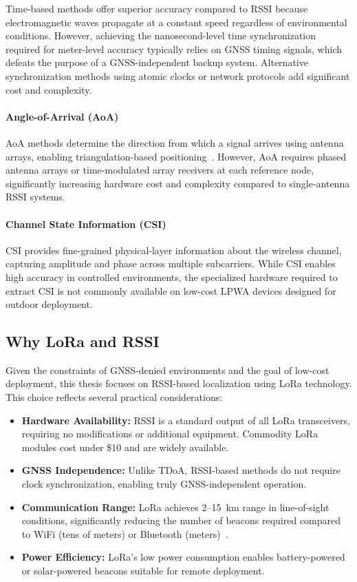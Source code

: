 \documentclass[master,final,11pt]{iscs-thesis}
\begin{document}
Time-based methods offer superior accuracy compared to RSSI because electromagnetic waves propagate at a constant speed regardless of environmental conditions.
However, achieving the nanosecond-level time synchronization required for meter-level accuracy typically relies on GNSS timing signals, which defeats the purpose of a GNSS-independent backup system.
Alternative synchronization methods using atomic clocks or network protocols add significant cost and complexity.

\paragraph{Angle-of-Arrival (AoA)}
AoA methods determine the direction from which a signal arrives using antenna arrays, enabling triangulation-based positioning~\cite{zafari2019survey}.
However, AoA requires phased antenna arrays or time-modulated array receivers at each reference node, significantly increasing hardware cost and complexity compared to single-antenna RSSI systems.

\paragraph{Channel State Information (CSI)}
CSI provides fine-grained physical-layer information about the wireless channel, capturing amplitude and phase across multiple subcarriers.
While CSI enables high accuracy in controlled environments, the specialized hardware required to extract CSI is not commonly available on low-cost LPWA devices designed for outdoor deployment.

\subsection{Why LoRa and RSSI}

Given the constraints of GNSS-denied environments and the goal of low-cost deployment, this thesis focuses on RSSI-based localization using LoRa technology.
This choice reflects several practical considerations:

\begin{itemize}
    \item \textbf{Hardware Availability:} RSSI is a standard output of all LoRa transceivers, requiring no modifications or additional equipment. Commodity LoRa modules cost under \$10 and are widely available.
    
    \item \textbf{GNSS Independence:} Unlike TDoA, RSSI-based methods do not require clock synchronization, enabling truly GNSS-independent operation.
    
    \item \textbf{Communication Range:} LoRa achieves 2--15~km range in line-of-sight conditions, significantly reducing the number of beacons required compared to WiFi (tens of meters) or Bluetooth (meters)~\cite{ref_lora_survey}.
    
    \item \textbf{Power Efficiency:} LoRa's low power consumption enables battery-powered or solar-powered beacons suitable for remote deployment.
\end{itemize}
\end{document}
